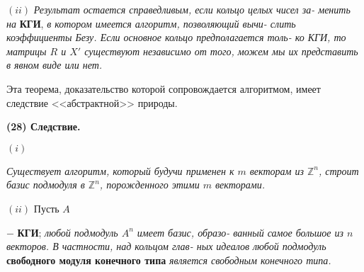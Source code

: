 \documentclass{mai_book}
\begin{document}
	$(ii)$ {\it Результат остается справедливым, если кольцо целых чисел за-\linebreak
	менить на} {\bf КГИ}, {\it в котором имеется алгоритм, позволяющий вычи-\linebreak
	слить коэффициенты Безу. Если основное кольцо предполагается толь-\linebreak
	ко КГИ, то матрицы $R$ и $X'$ существуют независимо от того, можем\linebreak
	мы их представить в явном виде или нет.}
	
	Эта теорема, доказательство которой сопровождается алгоритмом,\linebreak
	имеет следствие <<абстрактной>> природы.
	
	\noindent
	{\bf (28) Следствие.}
	
	$(i)$ {\it Существует алгоритм, который будучи применен к $m$ векторам\linebreak
	из ${\mathbb Z}^{n}$, строит базис подмодуля в ${\mathbb Z}^{n}$, порожденного этими $m$ векторами.
	
	$(ii)$ Пусть $A$ }$-$ {\bf КГИ}; {\it любой подмодуль $A^{n}$ имеет базис, образо-\linebreak
	ванный самое большое из $n$ векторов. В частности, над кольцом глав-\linebreak
	ных идеалов любой подмодуль} {\bf свободного модуля конечного типа}\linebreak
	{\it является свободным конечного типа.}
	
\end{document}
